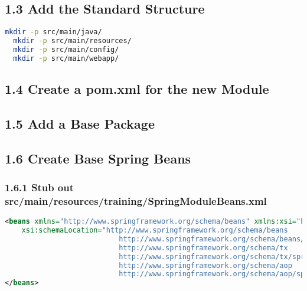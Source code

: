 \subsection*{1.3 Add the Standard Structure}
\begin{lstlisting}[language=bash,backgroundcolor=\color{ubergray},caption={Directory creation for Linux
    users},frame=single,breaklines=true]
  mkdir -p src/main/java/
  mkdir -p src/main/resources/
  mkdir -p src/main/config/
  mkdir -p src/main/webapp/
\end{lstlisting}

\subsection*{1.4 Create a pom.xml for the new Module}

\subsection*{1.5 Add a Base Package}

\subsection*{1.6 Create Base Spring Beans}
\subsubsection*{1.6.1 Stub out
  src/main/resources/training/SpringModuleBeans.xml}
\begin{lstlisting}[language=xml,backgroundcolor=\color{ubergray},caption={Base
  SpringModuleBeans.xml},frame=single,breaklines=true]
<beans xmlns="http://www.springframework.org/schema/beans" xmlns:xsi="http://www.w3.org/2001/XMLSchema-instance" xmlns:aop="http://www.springframework.org/schema/aop" xmlns:tx="http://www.springframework.org/schema/tx"
	xsi:schemaLocation="http://www.springframework.org/schema/beans
                           http://www.springframework.org/schema/beans/spring-beans-2.0.xsd
                           http://www.springframework.org/schema/tx
                           http://www.springframework.org/schema/tx/spring-tx-2.0.xsd
                           http://www.springframework.org/schema/aop
                           http://www.springframework.org/schema/aop/spring-aop-2.0.xsd">
</beans>
\end{lstlisting}

